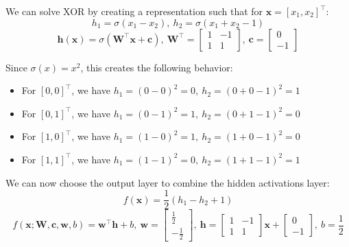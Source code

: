 \documentclass{article}
\begin{document}
{\color{blue} 
We can solve XOR by creating a representation such that for $\mathbf{x}=[x_1,x_2]^{\top}$:
\begin{equation}
    h_1= \sigma(x_1-x_2), \ h_2= \sigma(x_1+x_2-1) 
\end{equation}
\begin{equation}
    \mathbf{h}(\mathbf{x})= \sigma( \mathbf{W}^{\top} \mathbf{x}+ \mathbf{c}), \ \mathbf{W}^{\top}= 
    \begin{bmatrix}
         1&-1\\
         1&1
    \end{bmatrix}
    , \ \mathbf{c}= 
    \begin{bmatrix}
         0\\
         -1
    \end{bmatrix}
\end{equation}

Since $\sigma(x)=x^2$, this creates the following behavior:
\begin{itemize}
    \item For $[0,0]^{\top}$, we have $h_1= (0-0)^2= 0, \ h_2= (0+0-1)^2= 1$ 
    \item For $[0,1]^{\top}$, we have $h_1= (0-1)^2= 1, \ h_2= (0+1-1)^2= 0$ 
    \item For $[1,0]^{\top}$, we have $h_1= (1-0)^2= 1, \ h_2= (1+0-1)^2= 0$
    \item For $[1,1]^{\top}$, we have $h_1= (1-1)^2= 0, \ h_2=(1+1-1)^2= 1$
\end{itemize}

We can now choose the output layer to combine the hidden activations layer:
\begin{equation}
    f(\mathbf{x})= \frac{1}{2}(h_1-h_2+1) 
\end{equation}
\begin{equation}
    f(\mathbf{x};\mathbf{W}, \mathbf{c}, \bm{w},b)= \bm{w}^{\top} \mathbf{h}+b, \ \bm{w}= 
    \begin{bmatrix}
        \frac{1}{2}\\
        -\frac{1}{2}
    \end{bmatrix} 
    , \ \mathbf{h}= 
    \begin{bmatrix}
        1&-1\\
        1&1
    \end{bmatrix} 
    \mathbf{x}+ 
    \begin{bmatrix}
        0\\
        -1
    \end{bmatrix}
    , \ b= \frac{1}{2}
\end{equation}

}
\end{document}
